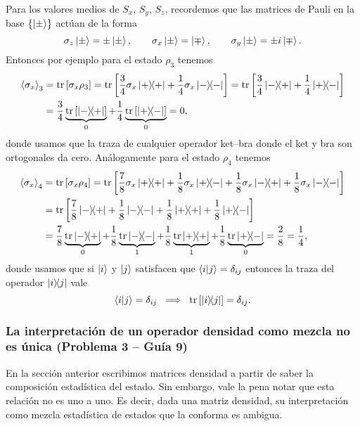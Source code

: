 \documentclass[10pt, a4paper]{article}
\numberwithin{equation}{subsection}
\begin{document}
Para los valores medios de $S_x$, $S_y$, $S_z$, recordemos que las matrices de
Pauli en la base $\set{\ket{\pm}}$ actúan de la forma
\begin{equation}
  \sigma_z\ket{\pm} = \pm\ket{\pm}, \qquad
  \sigma_x\ket{\pm} = \ket{\mp}, \qquad
  \sigma_y\ket{\pm} = \pm i\ket{\mp}.
\end{equation}
Entonces por ejemplo para el estado $\rho_3$ tenemos
\begin{align}
  \expval{\sigma_x}_3
  &= \tr\left[\sigma_x\rho_3\right]
  = \tr\left[\frac{3}{4}\sigma_x\projector{+} +
    \frac{1}{4}\sigma_x\projector{-}\right]
  = \tr\left[\frac{3}{4}\ketbra{-}{+} +
    \frac{1}{4}\ketbra{+}{-}\right] \nonumber \\
  &= \frac{3}{4}\underbrace{\tr\left[\ketbra{-}{+}\right]}_{0} +
    \frac{1}{4}\underbrace{\tr\left[\ketbra{+}{-}\right]}_{0}
  = 0,
\end{align}
donde usamos que la traza de cualquier operador ket--bra donde el ket y bra son
ortogonales da cero. Análogamente para el estado $\rho_4$ tenemos
\begin{align}
  \expval{\sigma_x}_4
  &= \tr\left[\sigma_x\rho_4\right]
  = \tr\left[\frac{7}{8}\sigma_x\ketbra{+}{+} +
    \frac{1}{8}\sigma_x\ketbra{+}{-} +
    \frac{1}{8}\sigma_x\ketbra{-}{+} +
    \frac{1}{8}\sigma_x\ketbra{-}{-}\right] \nonumber \\
  &= \tr\left[\frac{7}{8}\ketbra{-}{+} +
    \frac{1}{8}\ketbra{-}{-} +
    \frac{1}{8}\ketbra{+}{+} +
    \frac{1}{8}\ketbra{+}{-}\right] \nonumber \\
  &= \frac{7}{8}\underbrace{\tr\ketbra{-}{+}}_{0} +
    \frac{1}{8}\underbrace{\tr\ketbra{-}{-}}_{1} +
    \frac{1}{8}\underbrace{\tr\ketbra{+}{+}}_{1} +
    \frac{1}{8}\underbrace{\tr\ketbra{+}{-}}_{0}
  = \frac{2}{8} = \frac{1}{4},
\end{align}
donde usamos que si $\ket{i}$ y $\ket{j}$ satisfacen que $\braket{i}{j} =
\delta_{ij}$ entonces la traza del operador $\ketbra{i}{j}$ vale
\begin{equation} \label{prop:trketbra}
  \braket{i}{j} = \delta_{ij} \;\implies\; \tr\left[\ketbra{i}{j}\right] =
    \delta_{ij}.
\end{equation}

\subsubsection{La interpretación de un operador densidad como mezcla no es única
  (Problema 3 -- Guía 9)}
En la sección anterior escribimos matrices densidad a partir de saber la
composición estadística del estado. Sin embargo, vale la pena notar que esta
relación no es uno a uno. Es decir, dada una matriz densidad, su interpretación
como mezcla estadística de estados que la conforma es ambigua.
\end{document}
